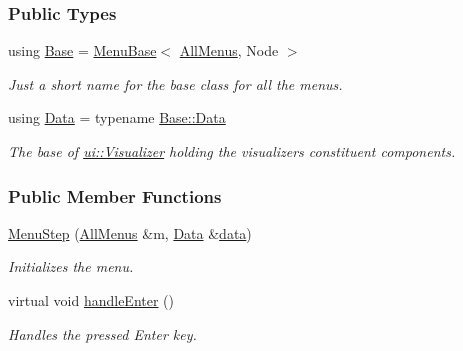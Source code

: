 \subsubsection*{Public Types}
\begin{DoxyCompactItemize}
\item 
using \hyperlink{structMenuStep_a210d9f8bc4b60117f32265e95f16bdac}{Base} = \hyperlink{structMenuBase}{Menu\+Base}$<$ \hyperlink{structAllMenus}{All\+Menus}, Node $>$\hypertarget{structMenuStep_a210d9f8bc4b60117f32265e95f16bdac}{}\label{structMenuStep_a210d9f8bc4b60117f32265e95f16bdac}

\begin{DoxyCompactList}\small\item\em Just a short name for the base class for all the menus. \end{DoxyCompactList}\item 
using \hyperlink{structMenuStep_ad2092c4da402220c92da6dd140f7b804}{Data} = typename \hyperlink{structMenuBase_a473a45fd8adbc75a9220b64753ae3837}{Base\+::\+Data}\hypertarget{structMenuStep_ad2092c4da402220c92da6dd140f7b804}{}\label{structMenuStep_ad2092c4da402220c92da6dd140f7b804}

\begin{DoxyCompactList}\small\item\em The base of \hyperlink{structui_1_1Visualizer}{ui\+::\+Visualizer} holding the visualizer\textquotesingle{}s constituent components. \end{DoxyCompactList}\end{DoxyCompactItemize}
\subsubsection*{Public Member Functions}
\begin{DoxyCompactItemize}
\item 
\hyperlink{structMenuStep_a33f7162049f9fb9f73d6b90fcc5206ee}{Menu\+Step} (\hyperlink{structAllMenus}{All\+Menus} \&m, \hyperlink{structMenuBase_a473a45fd8adbc75a9220b64753ae3837}{Data} \&\hyperlink{structMenuBase_a819aaaa06ede3bffbb12c1390657ef64}{data})
\begin{DoxyCompactList}\small\item\em Initializes the menu. \end{DoxyCompactList}\item 
virtual void \hyperlink{structMenuStep_a98266f34282baa14700ff84a0a60cd9e}{handle\+Enter} ()\hypertarget{structMenuStep_a98266f34282baa14700ff84a0a60cd9e}{}\label{structMenuStep_a98266f34282baa14700ff84a0a60cd9e}

\begin{DoxyCompactList}\small\item\em Handles the pressed Enter key. \end{DoxyCompactList}\end{DoxyCompactItemize}
